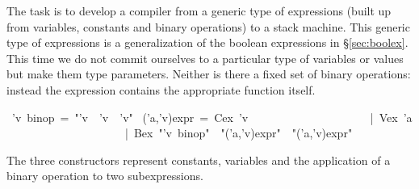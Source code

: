 \begin{isabelle}%
%
\begin{isamarkuptext}%
\noindent
The task is to develop a compiler from a generic type of expressions (built
up from variables, constants and binary operations) to a stack machine.  This
generic type of expressions is a generalization of the boolean expressions in
\S\ref{sec:boolex}.  This time we do not commit ourselves to a particular
type of variables or values but make them type parameters.  Neither is there
a fixed set of binary operations: instead the expression contains the
appropriate function itself.%
\end{isamarkuptext}%
~'v~binop~=~{"}'v~{\isasymRightarrow}~'v~{\isasymRightarrow}~'v{"}\isanewline
{}~('a,'v)expr~=~Cex~'v\isanewline
~~~~~~~~~~~~~~~~~~~~~|~Vex~'a\isanewline
~~~~~~~~~~~~~~~~~~~~~|~Bex~{"}'v~binop{"}~~{"}('a,'v)expr{"}~~{"}('a,'v)expr{"}%
\begin{isamarkuptext}%
\noindent
The three constructors represent constants, variables and the application of
a binary operation to two subexpressions.


\end{isamarkuptext}
\end{isabelle}
